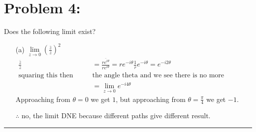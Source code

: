 \documentclass{article}
\begin{document}
\section*{Problem 4: }
Does the following limit exist?
\begin{enumerate}
\item[(a)] $\lim\limits_{z \to 0} \left(\frac{\bar{z}}{z}\right)^2$
  \begin{align*}
    \frac{\bar{z}}{z} &= \frac{\overline{re^{i\theta}}}{re^{i\theta}} = re^{-i\theta}\frac{1}{r}e^{-i\theta} = e^{-i2\theta}\\
                       \text{squaring this then doubles }&\text{the angle theta and we see there is no more dependence on r}\\
                      &=\lim\limits_{z \to 0} e^{-i4\theta}
  \end{align*}
  Approaching from $\theta = 0$ we get $1$, but approaching from $\theta = \frac{\pi}{4}$ we get $-1$. 

  $\therefore$ no, the limit DNE because different paths give different result.
\end{enumerate}
\hrule
\end{document}
